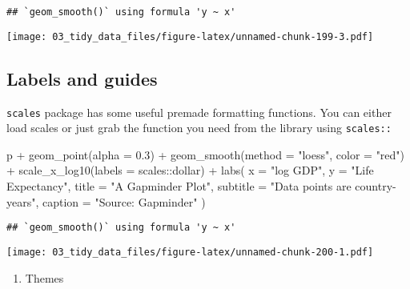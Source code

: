 \documentclass[
]{book}
\newenvironment{Shaded}{\begin{snugshade}}{\end{snugshade}}
\newcommand{\AttributeTok}[1]{\textcolor[rgb]{0.77,0.63,0.00}{#1}}
\newcommand{\FloatTok}[1]{\textcolor[rgb]{0.00,0.00,0.81}{#1}}
\newcommand{\FunctionTok}[1]{\textcolor[rgb]{0.00,0.00,0.00}{#1}}
\newcommand{\NormalTok}[1]{#1}
\newcommand{\SpecialCharTok}[1]{\textcolor[rgb]{0.00,0.00,0.00}{#1}}
\newcommand{\StringTok}[1]{\textcolor[rgb]{0.31,0.60,0.02}{#1}}
\providecommand{\tightlist}{%
  \setlength{\itemsep}{0pt}\setlength{\parskip}{0pt}}
\begin{document}
\begin{verbatim}
## `geom_smooth()` using formula 'y ~ x'
\end{verbatim}

\texttt{[image: 03\_tidy\_data\_files/figure-latex/unnamed-chunk-199-3.pdf]}

\hypertarget{labels-and-guides}{%
\subsection{Labels and guides}\label{labels-and-guides}}

\texttt{scales} package has some useful premade formatting functions. You can either load scales or just grab the function you need from the library using \texttt{scales::}

\begin{Shaded}
\begin{Highlighting}[]
\NormalTok{p }\SpecialCharTok{+} \FunctionTok{geom\_point}\NormalTok{(}\AttributeTok{alpha =} \FloatTok{0.3}\NormalTok{) }\SpecialCharTok{+}
  \FunctionTok{geom\_smooth}\NormalTok{(}\AttributeTok{method =} \StringTok{"loess"}\NormalTok{, }\AttributeTok{color =} \StringTok{"red"}\NormalTok{) }\SpecialCharTok{+}
  \FunctionTok{scale\_x\_log10}\NormalTok{(}\AttributeTok{labels =}\NormalTok{ scales}\SpecialCharTok{::}\NormalTok{dollar) }\SpecialCharTok{+}
  \FunctionTok{labs}\NormalTok{(}
    \AttributeTok{x =} \StringTok{"log GDP"}\NormalTok{,}
    \AttributeTok{y =} \StringTok{"Life Expectancy"}\NormalTok{,}
    \AttributeTok{title =} \StringTok{"A Gapminder Plot"}\NormalTok{,}
    \AttributeTok{subtitle =} \StringTok{"Data points are country{-}years"}\NormalTok{,}
    \AttributeTok{caption =} \StringTok{"Source: Gapminder"}
\NormalTok{  )}
\end{Highlighting}
\end{Shaded}

\begin{verbatim}
## `geom_smooth()` using formula 'y ~ x'
\end{verbatim}

\texttt{[image: 03\_tidy\_data\_files/figure-latex/unnamed-chunk-200-1.pdf]}

\begin{enumerate}
\def\labelenumi{\arabic{enumi}.}
\setcounter{enumi}{5}
\tightlist
\item
  Themes
\end{enumerate}
\end{document}
